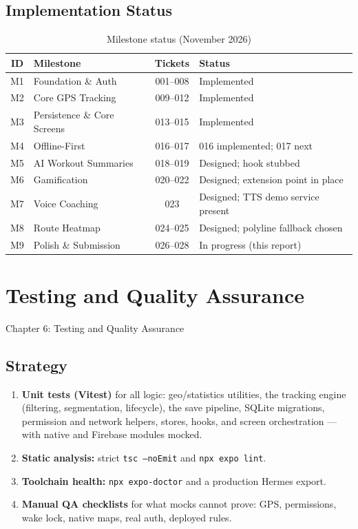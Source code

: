 \documentclass[12pt, a4paper]{report}
\newcommand{\code}[1]{\texttt{#1}}
\begin{document}
\section{Implementation Status}
\begin{table}[H]
\centering
\caption{Milestone status (November 2026)}
\label{tab:status}
\small
\begin{tabularx}{\textwidth}{@{}c l C L@{}}
\toprule
\textbf{ID} & \textbf{Milestone} & \textbf{Tickets} & \textbf{Status} \\
\midrule
M1 & Foundation \& Auth & 001--008 & Implemented \\
M2 & Core GPS Tracking & 009--012 & Implemented \\
M3 & Persistence \& Core Screens & 013--015 & Implemented \\
M4 & Offline-First & 016--017 & 016 implemented; 017 next \\
M5 & AI Workout Summaries & 018--019 & Designed; hook stubbed \\
M6 & Gamification & 020--022 & Designed; extension point in place \\
M7 & Voice Coaching & 023 & Designed; TTS demo service present \\
M8 & Route Heatmap & 024--025 & Designed; polyline fallback chosen \\
M9 & Polish \& Submission & 026--028 & In progress (this report) \\
\bottomrule
\end{tabularx}
\end{table}

\chapter{Testing and Quality Assurance}
          {Chapter 6: Testing and Quality Assurance}

\section{Strategy}
\begin{enumerate}[leftmargin=1.2cm]
  \item \textbf{Unit tests (Vitest)} for all logic: geo/statistics
        utilities, the tracking engine (filtering, segmentation, lifecycle),
        the save pipeline, SQLite migrations, permission and network
        helpers, stores, hooks, and screen orchestration --- with native and
        Firebase modules mocked.
  \item \textbf{Static analysis:} strict \code{tsc --noEmit} and
        \code{npx expo lint}.
  \item \textbf{Toolchain health:} \code{npx expo-doctor} and a production
        Hermes export.
  \item \textbf{Manual QA checklists} for what mocks cannot prove: GPS,
        permissions, wake lock, native maps, real auth, deployed rules.
\end{enumerate}
\end{document}
